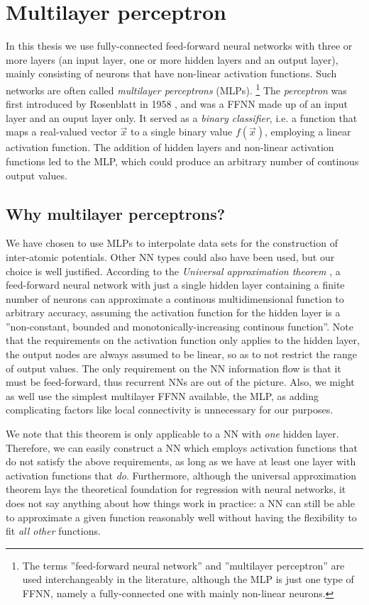 \documentclass[twoside,english]{uiofysmaster}
\begin{document}
\section{Multilayer perceptron}
In this thesis we use fully-connected feed-forward neural networks with three
or more layers (an input layer, one or more hidden layers and an output layer), mainly
consisting of neurons that have non-linear activation functions.
Such networks are often called \textit{multilayer perceptrons} (MLPs). 
\footnote{The terms ''feed-forward neural network'' and ''multilayer perceptron'' are used interchangeably in the 
literature, although the MLP is just one type of FFNN, namely a fully-connected one with mainly non-linear neurons.}
The \textit{perceptron} was first introduced by Rosenblatt in 1958 \cite{Rosenblatt58}, and was a FFNN made up of an input layer
and an ouput layer only. It served as a \textit{binary classifier}, i.e. a function that maps a real-valued vector $\vec{x}$ 
to a single binary value $f(\vec{x})$, employing a linear activation function. The addition of hidden layers and 
non-linear activation functions led to the MLP, which could produce an arbitrary number of continous output values. 

\subsection{Why multilayer perceptrons?} \label{sec:whyMLP}
We have chosen to use MLPs to interpolate data sets for the construction of inter-atomic potentials. 
Other NN types could also have been used, but our choice is well justified. According to the
\textit{Universal approximation theorem} \cite{Hornik89}, a feed-forward neural network with just a single hidden layer containing 
a finite number of neurons can approximate a continous multidimensional function to arbitrary accuracy, 
assuming the activation function for the hidden layer is a ''non-constant, bounded and monotonically-increasing continous function''.
Note that the requirements on the activation function only applies to the hidden layer, the output nodes are always
assumed to be linear, so as to not restrict the range of output values. 
The only requirement on the NN information flow is that it must be feed-forward, thus recurrent NNs are out of the picture. 
Also, we might as well use the simplest multilayer FFNN available, the MLP, as 
adding complicating factors like local connectivity is unnecessary for our purposes. 

We note that this theorem is only applicable to a NN with \textit{one} hidden layer. Therefore, we can easily construct a NN 
which employs activation functions that do not satisfy the above requirements, as long as we have at least one layer
with activation functions that \textit{do}. Furthermore, although the universal approximation theorem
lays the theoretical foundation for regression with neural networks, it does not say anything about how things work in practice: 
a NN can still be able to approximate a given function reasonably well without having the flexibility to fit \textit{all other}
functions. 
\end{document}
